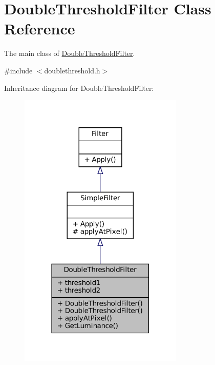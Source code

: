 \hypertarget{classDoubleThresholdFilter}{}\section{Double\+Threshold\+Filter Class Reference}
\label{classDoubleThresholdFilter}


The main class of \hyperlink{classDoubleThresholdFilter}{Double\+Threshold\+Filter}.  




{\ttfamily \#include $<$doublethreshold.\+h$>$}



Inheritance diagram for Double\+Threshold\+Filter\+:
\nopagebreak
\begin{figure}[H]
\begin{center}
\leavevmode
\includegraphics[width=222pt]{classDoubleThresholdFilter__inherit__graph}
\end{center}
\end{figure}



